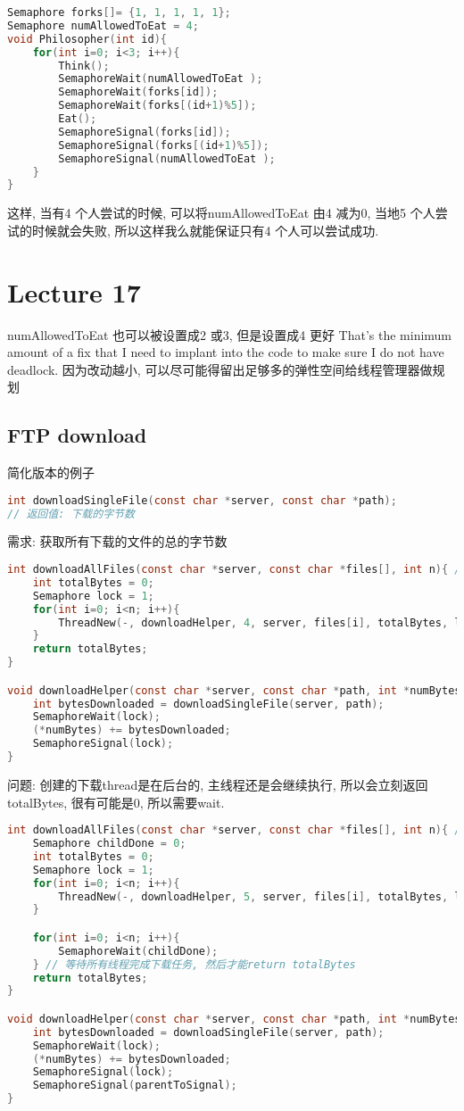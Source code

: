 \documentclass{article}
\begin{document}
\begin{lstlisting}[language = C]
Semaphore forks[]= {1, 1, 1, 1, 1};
Semaphore numAllowedToEat = 4;
void Philosopher(int id){
	for(int i=0; i<3; i++){
		Think();
		SemaphoreWait(numAllowedToEat );
		SemaphoreWait(forks[id]);
		SemaphoreWait(forks[(id+1)%5]);
		Eat();
		SemaphoreSignal(forks[id]);
		SemaphoreSignal(forks[(id+1)%5]);
		SemaphoreSignal(numAllowedToEat );
	}
}
\end{lstlisting}
这样, 当有4 个人尝试的时候, 可以将numAllowedToEat 由4 减为0, 当地5 个人尝试的时候就会失败, 所以这样我么就能保证只有4 个人可以尝试成功.

\section{Lecture 17}
numAllowedToEat 也可以被设置成2 或3, 但是设置成4 更好
That's the minimum amount of a fix that I need to implant into the code to make sure I do not have deadlock.
因为改动越小, 可以尽可能得留出足够多的弹性空间给线程管理器做规划

\subsection{FTP download}
简化版本的例子
\begin{lstlisting}[language = C]
int downloadSingleFile(const char *server, const char *path);
// 返回值: 下载的字节数
\end{lstlisting}

需求: 获取所有下载的文件的总的字节数
\begin{lstlisting}[language = C]
int downloadAllFiles(const char *server, const char *files[], int n){ // n files
	int totalBytes = 0;
	Semaphore lock = 1;
	for(int i=0; i<n; i++){
		ThreadNew(-, downloadHelper, 4, server, files[i], totalBytes, lock);
	}
	return totalBytes;
}

void downloadHelper(const char *server, const char *path, int *numBytes, Semaphore lock){
	int bytesDownloaded = downloadSingleFile(server, path);
	SemaphoreWait(lock);
	(*numBytes) += bytesDownloaded;
	SemaphoreSignal(lock);
}
\end{lstlisting}
问题: 创建的下载thread是在后台的, 主线程还是会继续执行, 所以会立刻返回totalBytes, 很有可能是0, 所以需要wait.

\begin{lstlisting}[language = C]
int downloadAllFiles(const char *server, const char *files[], int n){ // n files
	Semaphore childDone = 0;
	int totalBytes = 0;
	Semaphore lock = 1;
	for(int i=0; i<n; i++){
		ThreadNew(-, downloadHelper, 5, server, files[i], totalBytes, lock, childDone);
	}

	for(int i=0; i<n; i++){
		SemaphoreWait(childDone);
	} // 等待所有线程完成下载任务, 然后才能return totalBytes
	return totalBytes;
}

void downloadHelper(const char *server, const char *path, int *numBytes, Semaphore lock, Semaphore parentToSignal){
	int bytesDownloaded = downloadSingleFile(server, path);
	SemaphoreWait(lock);
	(*numBytes) += bytesDownloaded;
	SemaphoreSignal(lock);
	SemaphoreSignal(parentToSignal);
}
\end{lstlisting}
\end{document}
